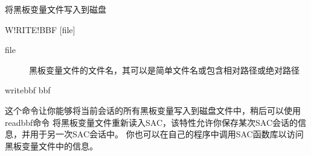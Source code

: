 \label{cmd:writebbf}

将黑板变量文件写入到磁盘

\begin{SACSTX}
W!RITE!BBF [file]
\end{SACSTX}

\begin{description}
\item [file] 黑板变量文件的文件名，其可以是简单文件名或包含相对路径或绝对路径
\end{description}

\begin{SACDFT}
writebbf bbf
\end{SACDFT}

这个命令让你能够将当前会话的所有黑板变量写入到磁盘文件中，稍后可以使用readbbf命令
将黑板变量文件重新读入SAC，该特性允许你保存某次SAC会话的信息，并用于另一次SAC会话中。
你也可以在自己的程序中调用SAC函数库以访问黑板变量文件中的信息。
